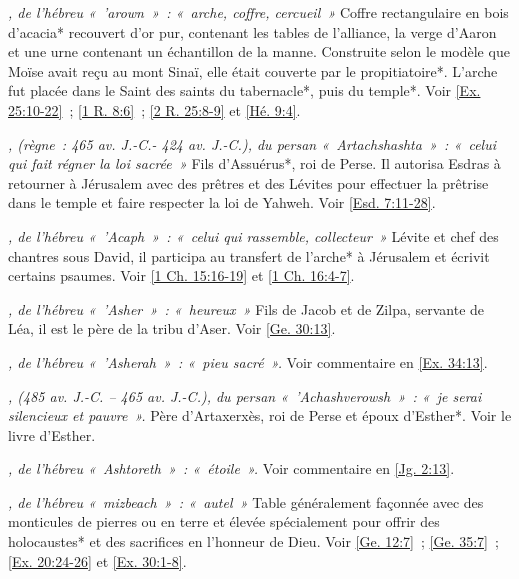 \begin{multicols}{2}
\textit{, de l'hébreu «~'arown~»~: «~arche, coffre, cercueil~»}\newline
Coffre rectangulaire en bois d'acacia* recouvert d'or pur, contenant les tables de l'alliance, la verge d'Aaron et une urne contenant un échantillon de la manne. Construite selon le modèle que Moïse avait reçu au mont Sinaï, elle était couverte par le propitiatoire*. L'arche fut placée dans le Saint des saints du tabernacle*, puis du temple*. Voir \vref{Ex. 25:10-22}~; \vref{1 R. 8:6}~; \vref{2 R. 25:8-9} et \vref{Hé. 9:4}.

\textit{, (règne~: 465 av. J.-C.- 424 av. J.-C.), du persan «~Artachshashta~»~: «~celui qui fait régner la loi sacrée~»}\newline
Fils d'Assuérus*, roi de Perse. Il autorisa Esdras à retourner à Jérusalem avec des prêtres et des Lévites pour effectuer la prêtrise dans le temple et faire respecter la loi de Yahweh. Voir \vref{Esd. 7:11-28}.

\textit{, de l'hébreu «~'Acaph~»~: «~celui qui rassemble, collecteur~»}\newline
Lévite et chef des chantres sous David, il participa au transfert de l'arche* à Jérusalem et écrivit certains psaumes. Voir \vref{1 Ch. 15:16-19} et \vref{1 Ch. 16:4-7}.

\textit{, de l'hébreu «~'Asher~»~: «~heureux~»}\newline
Fils de Jacob et de Zilpa, servante de Léa, il est le père de la tribu d'Aser. Voir \vref{Ge. 30:13}.

\textit{, de l'hébreu «~'Asherah~»~: «~pieu sacré~».}\newline
Voir commentaire en \vref{Ex. 34:13}.

\textit{, (485 av. J.-C. – 465 av. J.-C.), du persan «~'Achashverowsh~»~: «~je serai silencieux et pauvre~».}\newline
Père d'Artaxerxès, roi de Perse et époux d'Esther*. Voir le livre d'Esther.

\textit{, de l'hébreu «~Ashtoreth~»~: «~étoile~».}\newline
Voir commentaire en \vref{Jg. 2:13}.

\textit{, de l'hébreu «~mizbeach~»~: «~autel~»}\newline
Table généralement façonnée avec des monticules de pierres ou en terre et élevée spécialement pour offrir des holocaustes* et des sacrifices en l'honneur de Dieu. Voir \vref{Ge. 12:7}~; \vref{Ge. 35:7}~; \vref{Ex. 20:24-26} et \vref{Ex. 30:1-8}.


\end{multicols}
